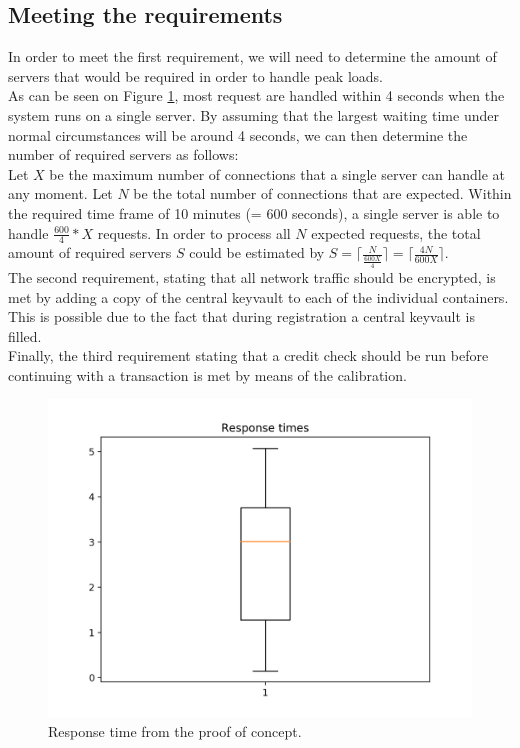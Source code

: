 \documentclass[conference]{IEEEtran}
\begin{document}
\subsection{Meeting the requirements}
In order to meet the first requirement, we will need to determine the amount of servers that would be required in order to handle peak loads. \\
As can be seen on Figure \ref{proofofconcept:boxplot}, most request are handled within 4 seconds when the system runs on a single server. By assuming that the largest waiting time under normal circumstances will be around 4 seconds, we can then determine the number of required servers as follows:\\
\indent Let $X$ be the maximum number of connections that a single server can handle at any moment. Let $N$ be the total number of connections that are expected. Within the required time frame of 10 minutes (= 600 seconds), a single server is able to handle $\frac{600}{4}*X$ requests. In order to process all $N$ expected requests, the total amount of required servers $S$ could be estimated by $S = \lceil \frac{N}{\frac{600X}{4}} \rceil = \lceil \frac{4N}{600X} \rceil$.\\
The second requirement, stating that all network traffic should be encrypted, is met by adding a copy of the central keyvault to each of the individual containers. This is possible due to the fact that during registration a central keyvault is filled.\\
Finally, the third requirement stating that a credit check should be run before continuing with a transaction is met by means of the calibration.

\begin{figure}[h]
	\includegraphics[scale=0.5]{diagrams/boxplot.png}
	\caption{\label{proofofconcept:boxplot}Response time from the proof of concept.}
	
\end{figure}
\end{document}

